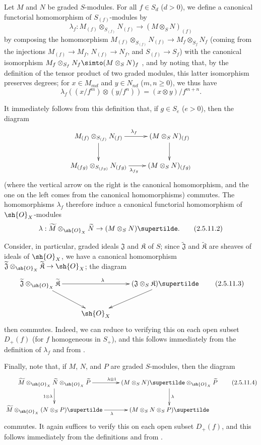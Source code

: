 \begin{env}[2.5.11]
\label{II.2.5.11}
Let $M$ and $N$ be graded $S$-modules.
For all $f\in S_d$ ($d>0$), we define a canonical functorial homomorphism of $S_{(f)}$-modules by
\[
\label{II.2.5.11.1}
  \lambda_f: M_{(f)}\otimes_{S_{(f)}}N_{(f)} \to (M\otimes_S N)_{(f)}
\tag{2.5.11.1}
\]
by composing the homomorphism $M_{(f)}\otimes_{S_{(f)}}N_{(f)}\to M_f\otimes_{S_f}N_f$ (coming from the injections $M_{(f)}\to M_f$, $N_{(f)}\to N_f$, and $S_{(f)}\to S_f$) with the canonical isomorphism $M_f\otimes_{S_f}N_f\simto(M\otimes_S N)_f$ , and by noting that, by the definition of the tensor product of two graded modules, this latter isomorphism preserves degrees;
for $x\in M_{md}$ and $y\in N_{nd}$ ($m,n\geq0$), we thus have
\[
  \lambda_f((x/f^m)\otimes(y/f^n)) = (x\otimes y)/f^{m+n}.
\]

It immediately follows from this definition that, if $g\in S_e$ ($e>0$), then the diagram
\[
  \xymatrix{
    M_{(f)}\otimes_{S_{(f)}}N_{(f)} \ar[r]^{\lambda_f} \ar[d]
    & (M\otimes_S N)_{(f)} \ar[d]
  \\M_{(fg)}\otimes_{S_{(fg)}}N_{(fg)} \ar[r]_{\lambda_{fg}}
    & (M\otimes_S N)_{(fg)}
  }
\]
(where the vertical arrow on the right is the canonical homomorphism, and the one on the left comes from the canonical homomorphisms) commutes.
The homomorphisms $\lambda_f$ therefore induce a canonical functorial homomorphism of $\sh{O}_X$-modules
\[
\label{II.2.5.11.2}
  \lambda: \widetilde{M}\otimes_{\sh{O}_X}\widetilde{N} \to (M\otimes_S N)\supertilde.
\tag{2.5.11.2}
\]

Consider, in particular, graded ideals $\mathfrak{J}$ and $\mathfrak{K}$ of $S$;
since $\widetilde{\mathfrak{J}}$ and $\widetilde{\mathfrak{K}}$ are sheaves of ideals of $\sh{O}_X$, we have a canonical homomorphism $\widetilde{\mathfrak{J}}\otimes_{\sh{O}_X}\widetilde{\mathfrak{K}}\to\sh{O}_X$;
the diagram
\[
\label{II.2.5.11.3}
  \xymatrix{
    \widetilde{\mathfrak{J}}\otimes_{\sh{O}_X}\widetilde{\mathfrak{K}} \ar[rr]^\lambda \ar[dr]
    && (\mathfrak{J}\otimes_S\mathfrak{K})\supertilde \ar[dl]
  \\&\sh{O}_X&
  }
\tag{2.5.11.3}
\]
then commutes.
Indeed, we can reduce to verifying this on each open subset $D_+(f)$ (for $f$ homogeneous in $S_+$), and this follows immediately from the definition  of $\lambda_f$ and from .

Finally, note that, if $M$, $N$, and $P$ are graded $S$-modules, then the diagram
\[
\label{II.2.5.11.4}
  \xymatrix{
    \widetilde{M}\otimes_{\sh{O}_X}\widetilde{N}\otimes_{\sh{O}_X}\widetilde{P} \ar[r]^{\lambda\otimes1} \ar[d]_{1\otimes\lambda}
    & (M\otimes_S N)\supertilde\otimes_{\sh{O}_X}\widetilde{P} \ar[d]^\lambda
  \\\widetilde{M}\otimes_{\sh{O}_X}(N\otimes_S P)\supertilde \ar[r]_\lambda
    & (M\otimes_S N\otimes_S P)\supertilde
  }
\tag{2.5.11.4}
\]
commutes.
It again suffices to verify this on each open subset $D_+(f)$, and this follows immediately from the definitions and from .
\end{env}


